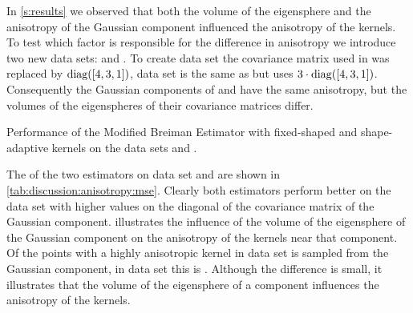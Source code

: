 	In \cref{s:results} we observed that both the volume of the eigensphere and the anisotropy of the Gaussian component influenced the anisotropy of the kernels. To test which factor is responsible for the difference in anisotropy we introduce two new data sets: \anisotropyOne and \anisotropyTwo.
	To create data set \anisotropyOne the covariance matrix used in \ferdosiOne was replaced by $\operatorname{diag}([4, 3, 1])$, data set \anisotropyTwo is the same as \anisotropyOne but uses $3 \cdot \operatorname{diag}([4, 3, 1])$.
	Consequently the Gaussian components of \anisotropyOne and \anisotropyTwo have the same anisotropy, but the volumes of the eigenspheres of their covariance matrices differ.
	\begin{table}
		\centering
		
		\caption{Performance of the Modified Breiman Estimator with fixed-shaped and shape-adaptive kernels on the data sets \anisotropyOne and \anisotropyTwo.} 	
		\label{tab:discussion:anisotropy:mse}
	\end{table}
	The \mses of the two estimators on data set \anisotropyOne and \anisotropyTwo are shown in \cref{tab:discussion:anisotropy:mse}. Clearly both estimators perform better on the data set with higher values on the diagonal of the covariance matrix of the Gaussian component.
	 illustrates the influence of the volume of the eigensphere of the Gaussian component on the anisotropy of the kernels near that component. Of the points with a highly anisotropic kernel in data set \anisotropyOne {} is sampled from the Gaussian component, in data set \anisotropyTwo this is . Although the difference is small, it illustrates that the volume of the eigensphere of a component influences the anisotropy of the kernels. 

